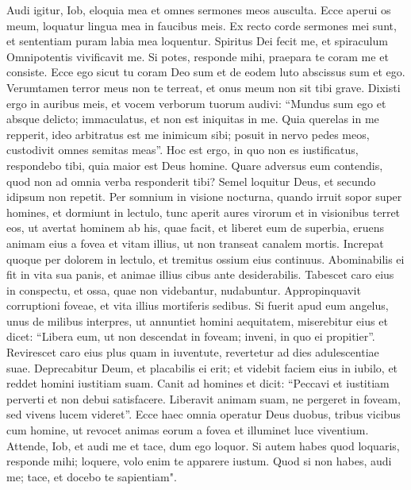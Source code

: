 \begin{biblechapter}  
\verse Audi igitur, Iob, eloquia mea et omnes sermones meos ausculta. 
\verse Ecce aperui os meum, loquatur lingua mea in faucibus meis. 
\verse Ex recto corde sermones mei sunt, et sententiam puram labia mea loquentur. 
\verse Spiritus Dei fecit me, et spiraculum Omnipotentis vivificavit me. 
\verse Si potes, responde mihi, praepara te coram me et consiste. 
\verse Ecce ego sicut tu coram Deo sum et de eodem luto abscissus sum et ego. 
\verse Verumtamen terror meus non te terreat, et onus meum non sit tibi grave. 
\verse Dixisti ergo in auribus meis, et vocem verborum tuorum audivi: 
\verse “Mundus sum ego et absque delicto; immaculatus, et non est iniquitas in me. 
\verse Quia querelas in me repperit, ideo arbitratus est me inimicum sibi; 
\verse posuit in nervo pedes meos, custodivit omnes semitas meas”. 
\verse Hoc est ergo, in quo non es iustificatus, respondebo tibi, quia maior est Deus homine. 
\verse Quare adversus eum contendis, quod non ad omnia verba responderit tibi? 
\verse Semel loquitur Deus, et secundo idipsum non repetit. 
\verse Per somnium in visione nocturna, quando irruit sopor super homines, et dormiunt in lectulo, 
\verse tunc aperit aures virorum et in visionibus terret eos, 
\verse ut avertat hominem ab his, quae facit, et liberet eum de superbia, 
\verse eruens animam eius a fovea et vitam illius, ut non transeat canalem mortis. 
\verse Increpat quoque per dolorem in lectulo, et tremitus ossium eius continuus. 
\verse Abominabilis ei fit in vita sua panis, et animae illius cibus ante desiderabilis. 
\verse Tabescet caro eius in conspectu, et ossa, quae non videbantur, nudabuntur. 
\verse Appropinquavit corruptioni foveae, et vita illius mortiferis sedibus. 
\verse Si fuerit apud eum angelus, unus de milibus interpres, ut annuntiet homini aequitatem, 
\verse miserebitur eius et dicet: “Libera eum, ut non descendat in foveam; inveni, in quo ei propitier”. 
\verse Revirescet caro eius plus quam in iuventute, revertetur ad dies adulescentiae suae. 
\verse Deprecabitur Deum, et placabilis ei erit; et videbit faciem eius in iubilo, et reddet homini iustitiam suam. 
\verse Canit ad homines et dicit: “Peccavi et iustitiam perverti et non debui satisfacere. 
\verse Liberavit animam suam, ne pergeret in foveam, sed vivens lucem videret”. 
\verse Ecce haec omnia operatur Deus duobus, tribus vicibus cum homine, 
\verse ut revocet animas eorum a fovea et illuminet luce viventium. 
\verse Attende, Iob, et audi me et tace, dum ego loquor. 
\verse Si autem habes quod loquaris, responde mihi; loquere, volo enim te apparere iustum. 
\verse Quod si non habes, audi me; tace, et docebo te sapientiam". 
\end{biblechapter}

